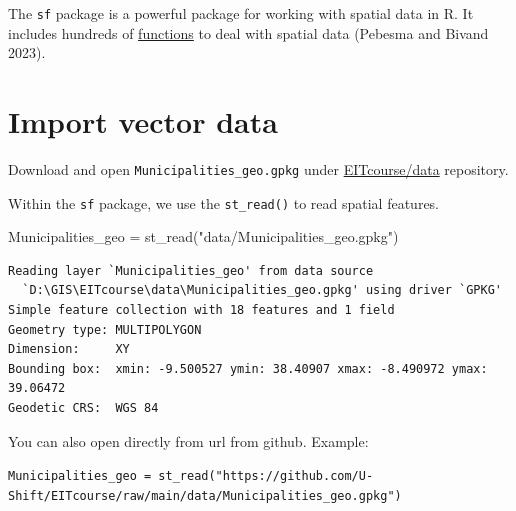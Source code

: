 \documentclass[
  letterpaper,
  DIV=11,
  numbers=noendperiod]{scrreprt}
\newenvironment{Shaded}{\begin{snugshade}}{\end{snugshade}}
\newcommand{\FunctionTok}[1]{\textcolor[rgb]{0.28,0.35,0.67}{#1}}
\newcommand{\NormalTok}[1]{\textcolor[rgb]{0.00,0.23,0.31}{#1}}
\newcommand{\OtherTok}[1]{\textcolor[rgb]{0.00,0.23,0.31}{#1}}
\newcommand{\StringTok}[1]{\textcolor[rgb]{0.13,0.47,0.30}{#1}}
\begin{document}
The \texttt{sf} package is a powerful package for working with spatial
data in R. It includes hundreds of
\href{https://r-spatial.github.io/sf/reference/index.html}{functions} to
deal with spatial data (Pebesma and Bivand 2023).

\section{Import vector data}\label{import-vector-data}

Download and open \texttt{Municipalities\_geo.gpkg} under
\href{https://github.com/U-Shift/EITcourse/tree/main/data}{EITcourse/data}
repository.

Within the \texttt{sf} package, we use the \texttt{st\_read()} to read
spatial features.

\begin{Shaded}
\begin{Highlighting}[]
\NormalTok{Municipalities\_geo }\OtherTok{=} \FunctionTok{st\_read}\NormalTok{(}\StringTok{"data/Municipalities\_geo.gpkg"}\NormalTok{)}
\end{Highlighting}
\end{Shaded}

\begin{verbatim}
Reading layer `Municipalities_geo' from data source 
  `D:\GIS\EITcourse\data\Municipalities_geo.gpkg' using driver `GPKG'
Simple feature collection with 18 features and 1 field
Geometry type: MULTIPOLYGON
Dimension:     XY
Bounding box:  xmin: -9.500527 ymin: 38.40907 xmax: -8.490972 ymax: 39.06472
Geodetic CRS:  WGS 84
\end{verbatim}

\begin{tcolorbox}[enhanced jigsaw, breakable, left=2mm, colframe=quarto-callout-tip-color-frame, leftrule=.75mm, bottomrule=.15mm, arc=.35mm, rightrule=.15mm, colback=white, opacityback=0, toprule=.15mm]
\begin{minipage}[t]{5.5mm}
\textcolor{quarto-callout-tip-color}{\faLightbulb}
\end{minipage}%
\begin{minipage}[t]{\textwidth - 5.5mm}

You can also open directly from url from github. Example:

\texttt{Municipalities\_geo\ =\ st\_read("https://github.com/U-Shift/EITcourse/raw/main/data/Municipalities\_geo.gpkg")}

\end{minipage}%
\end{tcolorbox}
\end{document}

